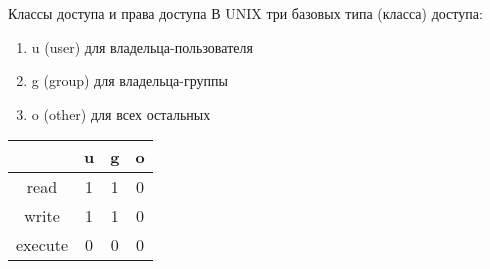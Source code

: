 \begin{frame}{Классы доступа и права доступа}
  В UNIX три базовых типа (класса) доступа:
  \begin{enumerate}
    \item \alert{u} (user) для владельца-пользователя
    \item \alert{g} (group) для владельца-группы         
    \item \alert{o} (other) для всех остальных \pause
  \end{enumerate}

  \begin{tabular}{c | c | c | c}
     & u & g & o \\ \hline
   read & 1 & 1 & 0 \\ \hline
   write & 1 & 1 & 0 \\ \hline
   execute & 0 & 0 & 0 \\ 
  \end{tabular}
\end{frame}
